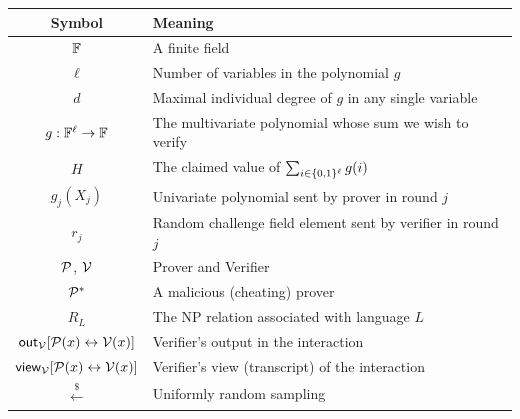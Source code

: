 \documentclass[11pt]{article}
\begin{document}
\begin{center}
\begin{tabular}{cl}
  \hline
  \textbf{Symbol} & \textbf{Meaning} \\
  \hline
  $\mathbb{F}$ & A finite field \\
  $\ell$ & Number of variables in the polynomial $g$ \\
  $d$ & Maximal individual degree of $g$ in any single variable \\
  $g : \mathbb{F}^\ell \to \mathbb{F}$ & The multivariate polynomial whose sum we wish to verify \\
  $H$ & The claimed value of $\sum_{i \in \{0,1\}^\ell} g(i)$ \\
  $g_j(X_j)$ & Univariate polynomial sent by prover in round $j$ \\
  $r_j$ & Random challenge field element sent by verifier in round $j$ \\
  $\mathcal{P}$, $\mathcal{V}$ & Prover and Verifier \\
  $\mathcal{P}^*$ & A malicious (cheating) prover \\
  $R_L$ & The NP relation associated with language $L$ \\
  $\mathsf{out}_{\mathcal{V}}[\mathcal{P}(x) \leftrightarrow \mathcal{V}(x)]$ & Verifier's output in the interaction \\
  $\mathsf{view}_{\mathcal{V}}[\mathcal{P}(x) \leftrightarrow \mathcal{V}(x)]$ & Verifier's view (transcript) of the interaction \\
  $\xleftarrow{\$}$ & Uniformly random sampling \\
  \hline
\end{tabular}
\end{center}
\end{document}
